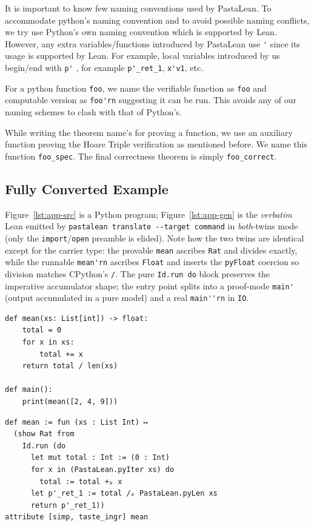 \documentclass{article}
\newcommand{\code}{\lstinline}
\begin{document}
{It is important to know few naming conventions used by PastaLean. To accommodate python's naming convention and to avoid possible naming conflicts, we try use Python's own naming convention which is supported by Lean. However, any extra variables/functions introduced by PastaLean use \code{'} since its usage is supported by Lean. For example, local variables introduced by us begin/end with \code{p'} , for example \code{p'_ret_1}, \code{x'v1}, etc.

For a python function \code{foo}, we name the verifiable function as \code{foo} and computable version as \code{foo'rn} suggesting it can be run. This avoids any of our naming schemes to clash with that of Python's.

While writing the theorem name's for proving a function, we use an auxiliary function proving the Hoare Triple verification as mentioned before. We name this function \code{foo_spec}. The final correctness theorem is simply \code{foo_correct}.

\subsection{Fully Converted Example}

\label{app:twins}
Figure~\ref{lst:app-src} is a Python program; Figure~\ref{lst:app-gen} is the \emph{verbatim}
Lean emitted by \code{pastalean translate --target command} in \emph{both}-twins mode (only the
\code{import}/\code{open} preamble is elided). Note how the two twins are identical except for the
carrier type: the provable \code{mean} ascribes \code{Rat} and divides exactly, while the runnable
\code{mean'rn} ascribes \code{Float} and inserts the \code{pyFloat} coercion so division matches
CPython's \code{/}. The pure \code{Id.run do} block preserves the imperative accumulator shape; the
entry point splits into a proof-mode \code{main'} (output accumulated in a pure model) and a real
\code{main''rn} in \code{IO}.

\begin{lstlisting}[style=py,caption={Python source.},label={lst:app-src}]
def mean(xs: List[int]) -> float:
    total = 0
    for x in xs:
        total += x
    return total / len(xs)

def main():
    print(mean([2, 4, 9]))
\end{lstlisting}

\begin{lstlisting}[style=lean,caption={Verbatim generated Lean (provable + runnable twins).},label={lst:app-gen}]
def mean := fun (xs : List Int) ↦
  (show Rat from
    Id.run (do
      let mut total : Int := (0 : Int)
      for x in (PastaLean.pyIter xs) do
        total := total +ₚ x
      let p'_ret_1 := total /ₚ PastaLean.pyLen xs
      return p'_ret_1))
attribute [simp, taste_ingr] mean


\end{lstlisting}}
\end{document}
